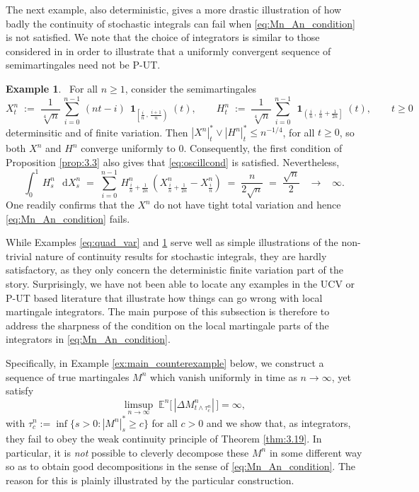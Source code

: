 \documentclass[11pt]{article}
\theoremstyle{definition}\newtheorem{example}[theorem]{Example}
\theoremstyle{definition}\newtheorem{counterexample}[theorem]{Counterexample}
\theoremstyle{definition}\newtheorem{remark}[theorem]{Remark}
\theoremstyle{definition}\newtheorem{defi}[theorem]{Definition}
\numberwithin{equation}{section}
\newcommand*\diff{\mathop{}\!\mathrm{d}}								%
\newcommand{\ind}{\operatorname{\mathbf{1}}}							%
\renewcommand{\|}{\; : \, \;}											%
\newcommand{\conv}[2]{\; \xrightarrow[ {#1}]{#2} \; }						%
\begin{document}
The next example, also deterministic, gives a more drastic illustration of how badly the continuity of stochastic integrals can fail when \eqref{eq:Mn_An_condition} is not satisfied. We note that the choice of integrators is similar to those considered in \cite[§6b, p.~382]{shiryaev} in order to illustrate that a uniformly convergent sequence of semimartingales need not be P-UT.




\begin{example} \ \label{ex:count_gd_fv} For all $n\ge 1$, consider the semimartingales
	$$ X_t^n \; := \; \frac{1}{\sqrt[4]{n}} \, \sum_{i=0}^{n-1} \, (nt - i)\,  \ind_{\left[ \frac{i}{n}\,, \, \frac{i+1}{n} \right)}(t), \qquad  H^n_t \; := \; \frac{1}{\sqrt[4]{n}} \, \sum_{i=0}^{n-1} \, \ind_{\left( \frac{i}{n}\,, \, \frac{i}{n}+\frac{1}{2n} \right]}(t), \qquad t\ge 0$$
	determinsitic and of finite variation. Then $|X^n|^*_t\vee |H^n|^*_t\le n^{-1/4}$, for all $t\ge 0$, so both $X^n$ and $H^n$ converge uniformly to $0$. Consequently, the first condition of Proposition \ref{prop:3.3} also gives that \eqref{eq:oscillcond} is satisfied. Nevertheless,
	$$ \int_0^1 \, H^n_{s} \, \diff X^n_s \; = \; \sum_{i=0}^{n-1} \, H_{\frac{i}{n}+\frac{1}{2n}}^n \, \left(X^n_{\frac{i}{n}+\frac{1}{2n}} - X^n_{\frac{i}{n}} \right) \; = \; \frac{n}{2\sqrt{n}} \; = \; \frac{\sqrt{n}}{2} \; \; \conv{}{} \; \; \infty.$$
	One readily confirms that the $X^n$ do not have tight total variation and hence \eqref{eq:Mn_An_condition} fails.
\end{example}


While Examples \ref{eq:quad_var} and \ref{ex:count_gd_fv} serve well as simple illustrations of the non-trivial nature of continuity results for stochastic integrals, they are hardly satisfactory, as they only concern the deterministic finite variation part of the story. Surprisingly, we have not been able to locate any examples in the UCV or P-UT based literature that illustrate how things can go wrong with local martingale integrators. The main purpose of this subsection is therefore to address the sharpness of the condition on the local martingale parts of the integrators in \eqref{eq:Mn_An_condition}.

Specifically, in Example \ref{ex:main_counterexample} below, we construct a sequence of true martingales $M^n$ which vanish uniformly in time as  $n\rightarrow \infty$, yet satisfy
\begin{equation}\label{eq:unqieldy jumps}
	\limsup_{n\rightarrow \infty} \; \mathbb{E}^n\bigl[\, |\Delta M^n_{t \land \tau^n_c}|\, \bigr] =\infty,
\end{equation}
with $\tau^n_c:= \operatorname{inf}\{s >0: |M^n|^*_s\ge c \}$ for all $c>0$ and we show that, as integrators, they fail to obey the weak continuity principle of Theorem \ref{thm:3.19}. In particular, it is \emph{not} possible to cleverly decompose these $M^n$ in some different way so as to obtain good decompositions in the sense of \eqref{eq:Mn_An_condition}. The reason for this is plainly illustrated by the particular construction.
\end{document}
